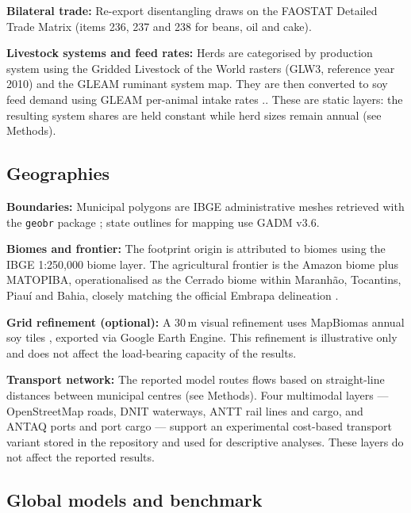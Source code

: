 \documentclass[pdflatex,sn-nature]{sn-jnl}%
\begin{document}
\textbf{Bilateral trade:} Re-export disentangling draws on the FAOSTAT
Detailed Trade Matrix (items 236, 237 and 238 for beans, oil and cake).

\textbf{Livestock systems and feed rates:} Herds are categorised by production system using the Gridded Livestock of the World rasters (GLW3, reference year 2010) \cite{gilbert2018glw} and the GLEAM ruminant system map. They are then converted to soy feed demand using GLEAM per-animal intake rates \cite{fao2018gleam}.. These are static layers: the resulting system shares are held constant while herd sizes remain annual (see Methods).

\subsection{Geographies}\label{subsec:geo}

\textbf{Boundaries:} Municipal polygons are IBGE administrative meshes
retrieved with the \texttt{geobr} package \cite{pereira2019geobr}; state
outlines for mapping use GADM v3.6.

\textbf{Biomes and frontier:} The footprint origin is attributed to biomes using the IBGE 1:250{,}000 biome layer. The agricultural frontier is the Amazon biome plus MATOPIBA, operationalised as the Cerrado biome within Maranh\~ao, Tocantins, Piau\'i and Bahia, closely matching the official Embrapa delineation \cite{miranda2014matopiba}.

\textbf{Grid refinement (optional):} A 30\,m visual refinement uses
MapBiomas annual soy tiles \cite{souza2020mapbiomas}, exported via Google
Earth Engine. This refinement is illustrative only and does not affect the load-bearing capacity of the results.

\textbf{Transport network:} The reported model routes flows based on straight-line distances between municipal centres (see Methods). Four multimodal layers — OpenStreetMap roads, DNIT waterways, ANTT rail lines and cargo, and ANTAQ ports and port cargo — support an experimental cost-based transport variant stored in the repository and used for descriptive analyses. These layers do not affect the reported results.

\subsection{Global models and benchmark}\label{subsec:mrio-data}
\end{document}
